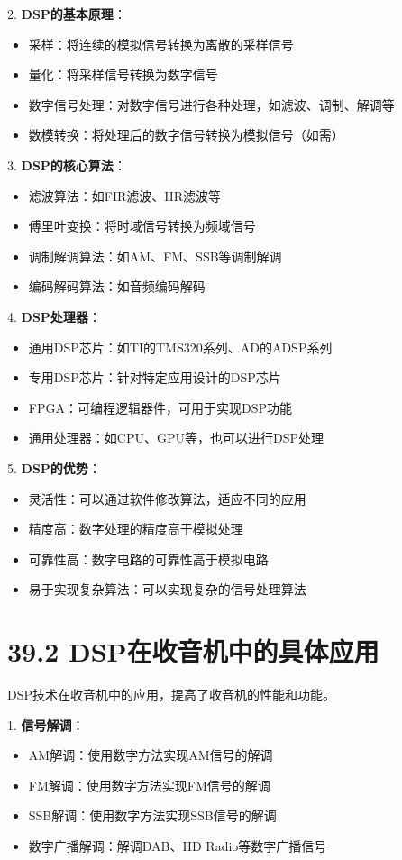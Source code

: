 \documentclass[12pt,UTF8]{ctexbook}
\begin{document}
2. \textbf{DSP的基本原理}：
   \begin{itemize}[leftmargin=3.5em]
   \item 采样：将连续的模拟信号转换为离散的采样信号
   \item 量化：将采样信号转换为数字信号
   \item 数字信号处理：对数字信号进行各种处理，如滤波、调制、解调等
   \item 数模转换：将处理后的数字信号转换为模拟信号（如需）
   \end{itemize}

3. \textbf{DSP的核心算法}：
   \begin{itemize}[leftmargin=3.5em]
   \item 滤波算法：如FIR滤波、IIR滤波等
   \item 傅里叶变换：将时域信号转换为频域信号
   \item 调制解调算法：如AM、FM、SSB等调制解调
   \item 编码解码算法：如音频编码解码
   \end{itemize}

4. \textbf{DSP处理器}：
   \begin{itemize}[leftmargin=3.5em]
   \item 通用DSP芯片：如TI的TMS320系列、AD的ADSP系列
   \item 专用DSP芯片：针对特定应用设计的DSP芯片
   \item FPGA：可编程逻辑器件，可用于实现DSP功能
   \item 通用处理器：如CPU、GPU等，也可以进行DSP处理
   \end{itemize}

5. \textbf{DSP的优势}：
   \begin{itemize}[leftmargin=3.5em]
   \item 灵活性：可以通过软件修改算法，适应不同的应用
   \item 精度高：数字处理的精度高于模拟处理
   \item 可靠性高：数字电路的可靠性高于模拟电路
   \item 易于实现复杂算法：可以实现复杂的信号处理算法
   \end{itemize}

\section*{39.2 DSP在收音机中的具体应用}

DSP技术在收音机中的应用，提高了收音机的性能和功能。

1. \textbf{信号解调}：
   \begin{itemize}[leftmargin=3.5em]
   \item AM解调：使用数字方法实现AM信号的解调
   \item FM解调：使用数字方法实现FM信号的解调
   \item SSB解调：使用数字方法实现SSB信号的解调
   \item 数字广播解调：解调DAB、HD Radio等数字广播信号
   \end{itemize}
\end{document}
